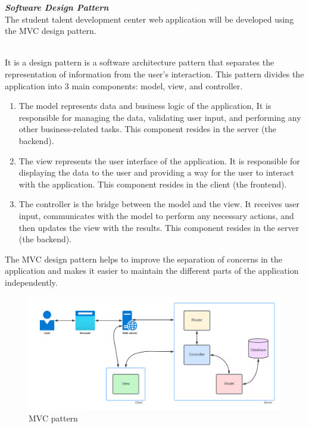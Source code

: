 \begin{justify}
\newendline \textbf{\textit{Software Design Pattern}}\\
The student talent development center web application will be developed using the MVC design pattern.

\vspace{0.25cm}
\\
It is a design pattern is a software architecture pattern that separates the representation of information from the user's interaction. This pattern divides the application into 3 main components: model, view, and controller.
\begin{enumerate}[itemsep=-0.3cm]
    \item The model represents data and business logic of the application, It is responsible for managing the data, validating user input, and performing any other business-related tasks. This component resides in the server (the backend).
    \item The view represents the user interface of the application. It is responsible for displaying the data to the user and providing a way for the user to interact with the application. This component resides in the client (the frontend).
    \item The controller is the bridge between the model and the view. It receives user input, communicates with the model to perform any necessary actions, and then updates the view with the results. This component resides in the server (the backend).
\end{enumerate}

\vspace{0.25cm}
\noindent The MVC design pattern helps to improve the separation of concerns in the application and makes it easier to maintain the different parts of the application independently.

\begin{figure}[H]
    \centerline{\includegraphics[width=150mm,scale=1]{figures/analysis_and_design/design/MVC V1.png}}
    \caption{MVC pattern}
    \label{MVC}
\end{figure}


\end{justify}
